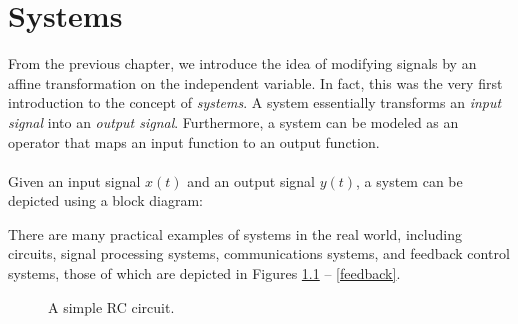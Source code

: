 \documentclass{report}
\begin{document}
\setcounter{chapter}{1}
\chapter{Systems}
From the previous chapter, we introduce the idea of modifying signals by an affine transformation on the independent variable. 
In fact, this was the very first introduction to the concept of \emph{systems}. A system essentially transforms an \emph{input signal} 
into an \emph{output signal}. Furthermore, a system can be modeled as an operator that maps an input function to an output function.
\\ \\
Given an input signal $x(t)$ and an output signal $y(t)$, a system can be depicted using a block diagram:

\begin{center}
\end{center}

There are many practical examples of systems in the real world, including circuits, signal processing systems, 
communications systems, and feedback control systems, those of which are depicted in Figures \ref{RC_circuit} -- \ref{feedback}.

\begin{figure}[!hbt]
    \caption{A simple RC circuit.}
    \label{RC_circuit}
    \centering
\end{figure}
\end{document}
